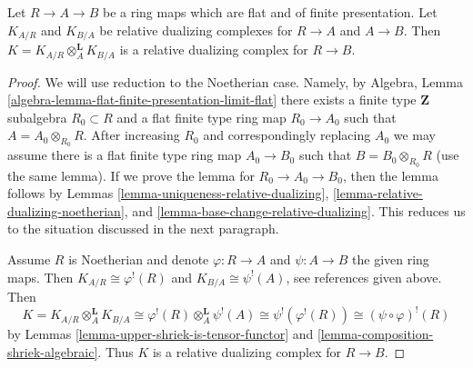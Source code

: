 \begin{lemma}
\label{lemma-relative-dualizing-composition}
Let $R \to A \to B$ be a ring maps which are flat and of finite presentation.
Let $K_{A/R}$ and $K_{B/A}$ be relative dualizing complexes for $R \to A$
and $A \to B$. Then $K = K_{A/R} \otimes_A^\mathbf{L} K_{B/A}$
is a relative dualizing complex for $R \to B$.
\end{lemma}

\begin{proof}
We will use reduction to the Noetherian case.
Namely, by Algebra, Lemma
\ref{algebra-lemma-flat-finite-presentation-limit-flat}
there exists a finite type $\mathbf{Z}$ subalgebra $R_0 \subset R$
and a flat finite type ring map $R_0 \to A_0$ such that
$A = A_0 \otimes_{R_0} R$. After increasing $R_0$ and correspondingly
replacing $A_0$ we may assume there is a flat
finite type ring map $A_0 \to B_0$ such that $B = B_0 \otimes_{R_0} R$
(use the same lemma). If we prove the lemma for $R_0 \to A_0 \to B_0$,
then the lemma follows by Lemmas
\ref{lemma-uniqueness-relative-dualizing},
\ref{lemma-relative-dualizing-noetherian}, and
\ref{lemma-base-change-relative-dualizing}.
This reduces us to the situation discussed in the next paragraph.

\medskip\noindent
Assume $R$ is Noetherian and denote $\varphi : R \to A$ and
$\psi : A \to B$ the given ring maps. Then $K_{A/R} \cong \varphi^!(R)$ and
$K_{B/A} \cong \psi^!(A)$, see references given above.
Then
$$
K = K_{A/R} \otimes_A^\mathbf{L} K_{B/A} \cong
\varphi^!(R) \otimes_A^\mathbf{L} \psi^!(A) \cong
\psi^!(\varphi^!(R)) \cong (\psi \circ \varphi)^!(R)
$$
by Lemmas \ref{lemma-upper-shriek-is-tensor-functor} and
\ref{lemma-composition-shriek-algebraic}. Thus $K$ is a relative
dualizing complex for $R \to B$.
\end{proof}











